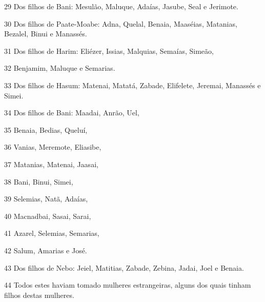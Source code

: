 \par 29 Dos filhos de Bani: Mesulão, Maluque, Adaías, Jasube, Seal e Jerimote.
\par 30 Dos filhos de Paate-Moabe: Adna, Quelal, Benaia, Maaséias, Matanias, Bezalel, Binui e Manassés.
\par 31 Dos filhos de Harim: Eliézer, Issias, Malquias, Semaías, Simeão,
\par 32 Benjamim, Maluque e Semarias.
\par 33 Dos filhos de Hasum: Matenai, Matatá, Zabade, Elifelete, Jeremai, Manassés e Simei.
\par 34 Dos filhos de Bani: Maadai, Anrão, Uel,
\par 35 Benaia, Bedias, Queluí,
\par 36 Vanias, Meremote, Eliasibe,
\par 37 Matanias, Matenai, Jaasai,
\par 38 Bani, Binui, Simei,
\par 39 Selemias, Natã, Adaías,
\par 40 Macnadbai, Sasai, Sarai,
\par 41 Azarel, Selemias, Semarias,
\par 42 Salum, Amarias e José.
\par 43 Dos filhos de Nebo: Jeiel, Matitias, Zabade, Zebina, Jadai, Joel e Benaia.
\par 44 Todos estes haviam tomado mulheres estrangeiras, alguns dos quais tinham filhos destas mulheres.


